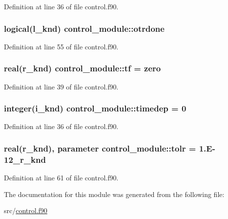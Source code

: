 Definition at line 36 of file control.\-f90.

\hypertarget{classcontrol__module_a2a2bc582701b890779931ca8180a79e4}{
\subsubsection[{otrdone}]{\setlength{\rightskip}{0pt plus 5cm}logical(l\-\_\-knd) control\-\_\-module\-::otrdone}}\label{classcontrol__module_a2a2bc582701b890779931ca8180a79e4}


Definition at line 55 of file control.\-f90.

\hypertarget{classcontrol__module_a144620f0322c0ca01d9034fedd8d1076}{
\subsubsection[{tf}]{\setlength{\rightskip}{0pt plus 5cm}real(r\-\_\-knd) control\-\_\-module\-::tf = zero}}\label{classcontrol__module_a144620f0322c0ca01d9034fedd8d1076}


Definition at line 39 of file control.\-f90.

\hypertarget{classcontrol__module_a19077c84dfe2f11b40e39a9a63178731}{
\subsubsection[{timedep}]{\setlength{\rightskip}{0pt plus 5cm}integer(i\-\_\-knd) control\-\_\-module\-::timedep = 0}}\label{classcontrol__module_a19077c84dfe2f11b40e39a9a63178731}


Definition at line 36 of file control.\-f90.

\hypertarget{classcontrol__module_ad7c6872b7fb56bee7e7870e4ffa9dc65}{
\subsubsection[{tolr}]{\setlength{\rightskip}{0pt plus 5cm}real(r\-\_\-knd), parameter control\-\_\-module\-::tolr = 1.\-E-\/12\-\_\-r\-\_\-knd}}\label{classcontrol__module_ad7c6872b7fb56bee7e7870e4ffa9dc65}


Definition at line 61 of file control.\-f90.



The documentation for this module was generated from the following file\-:\begin{DoxyCompactItemize}
\item 
src/\hyperlink{control_8f90}{control.\-f90}\end{DoxyCompactItemize}
